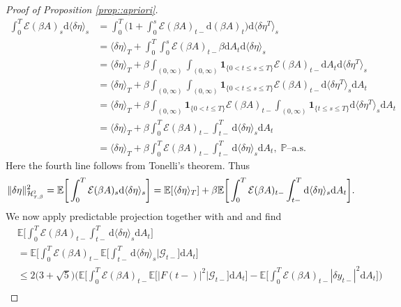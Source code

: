 \documentclass[10pt]{article} %
\newcommand\cE{\mathcal E}
\newcommand\cG{\mathcal G}
\newcommand\cH{\mathcal H}
\newcommand{\smalltext}[1]{\text{\fontsize{4}{4}\selectfont$#1$}}
\def \E{\mathbb{E}}
\def \P{\mathbb{P}}
\newcommand{\etaconst}{2\big(3 + \sqrt{5}\big)}
\def\d{\mathrm{d}}
\begin{document}
\begin{proof}[Proof of Proposition \ref{prop::apriori}]
\begin{align*}
	\int_0^T \cE(\beta A)_s \d \langle\delta\eta \rangle_s 
	&= \int_0^T \bigg(1+\int_0^s \cE(\beta A)_{t-}\d(\beta A)_t\bigg) \d \langle\delta\eta^T \rangle_s\\
	&= \langle \delta \eta \rangle_T + \int_0^T \int_0^s \cE(\beta A)_{t-}\beta\d A_t \d \langle \delta \eta \rangle_s \\
	&= \langle \delta \eta \rangle_T + \beta \int_{(0,\infty)} \int_{(0,\infty)} \mathbf{1}_{\{0<t\leq s \leq T\}} \cE(\beta A)_{t-} \d A_t \d \langle \delta \eta^T \rangle_s \\
	&= \langle \delta \eta \rangle_T + \beta \int_{(0,\infty)} \int_{(0,\infty)} \mathbf{1}_{\{0<t\leq s \leq T\}} \cE(\beta A)_{t-} \d \langle \delta \eta^T \rangle_s\d A_t \\
	&= \langle \delta \eta \rangle_T + \beta \int_{(0,\infty)} \mathbf{1}_{\{0<t\leq T\}} \cE(\beta A)_{t-} \int_{(0,\infty)} \mathbf{1}_{\{t\leq s \leq T\}} \d \langle \delta \eta^T \rangle_s\d A_t \\
	&= \langle \delta \eta \rangle_T + \beta \int_0^T \cE(\beta A)_{t-} \int_{t-}^T \d \langle \delta \eta \rangle_s\d A_t \\
	&= \langle \delta \eta \rangle_T + \beta \int_0^T \cE(\beta A)_{t-} \int_{t-}^T \d \langle \delta \eta \rangle_s\d A_t, \; \text{$\P$--a.s.}
\end{align*}
Here the fourth line follows from Tonelli's theorem. Thus
\begin{equation}\label{eq::decompeta}
	\|\delta\eta\|^2_{\cH^\smalltext{2}_{\smalltext{T}\smalltext{,}\beta}} 
	= \E\bigg[\int_0^T \cE(\beta A)_s \d \langle\delta\eta \rangle_s\bigg] 
	= \E [ \langle \delta\eta \rangle_T ] + \beta \E \bigg[ \int_0^T \cE(\beta A)_{t-} \int_{t-}^T \d \langle \delta\eta \rangle_s \d A_t \bigg].
\end{equation}
We now apply predictable projection together with  and \cite[Theorem VI.57]{dellacherie1982probabilities} and find
\begin{align*}
	&\E \bigg[ \int_0^T \cE(\beta A)_{t-} \int_{t-}^T \d \langle \delta\eta \rangle_s \d A_t \bigg] \\
	&= \E \bigg[ \int_0^T \cE(\beta A)_{t-} \E \bigg[ \int_{t-}^T \d \langle \delta\eta \rangle_s \bigg| \cG_{t-} \bigg] \d A_t \bigg] \\
	&\leq \etaconst \bigg(\E\bigg[ \int_0^T \cE(\beta A)_{t-} \E \big[ |F(t-)|^2 \big| \cG_{t-}\big] \d A_t \bigg] - \E\bigg[ \int_0^T \cE(\beta A)_{t-}|\delta y_{t-}|^2 \d A_t \bigg]\bigg) \\

\end{align*}
\end{proof}
\end{document}
